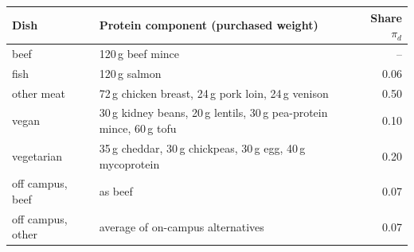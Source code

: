 \begin{tabular}{llr}
\toprule
Dish & Protein component (purchased weight) & Share $\pi_d$ \\
\midrule
beef & 120\,g beef mince & -- \\
fish & 120\,g salmon & 0.06 \\
other meat & 72\,g chicken breast, 24\,g pork loin, 24\,g venison & 0.50 \\
vegan & 30\,g kidney beans, 20\,g lentils, 30\,g pea-protein mince, 60\,g tofu & 0.10 \\
vegetarian & 35\,g cheddar, 30\,g chickpeas, 30\,g egg, 40\,g mycoprotein & 0.20 \\
off campus, beef & as beef & 0.07 \\
off campus, other & average of on-campus alternatives & 0.07 \\
\bottomrule
\end{tabular}
